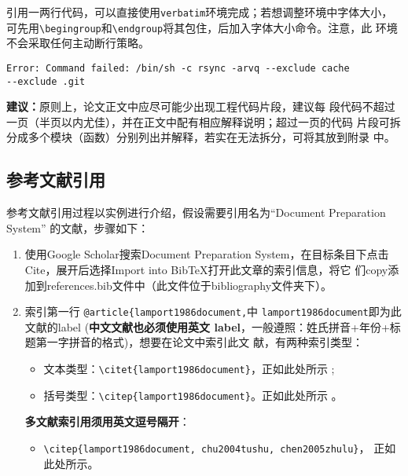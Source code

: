 引用一两行代码，可以直接使用\texttt{verbatim}环境完成；若想调整环境中字体大小，
可先用\verb|\begingroup|和\verb|\endgroup|将其包住，后加入字体大小命令。注意，此
环境不会采取任何主动断行策略。

\begingroup
    \small
    \begin{verbatim}
Error: Command failed: /bin/sh -c rsync -arvq --exclude cache
--exclude .git 
    \end{verbatim}
\endgroup

\begin{leftbar}
    \noindent\textbf{建议：}原则上，论文正文中应尽可能少出现工程代码片段，建议每
    段代码不超过一页（半页以内尤佳），并在正文中配有相应解释说明；超过一页的代码
    片段可拆分成多个模块（函数）分别列出并解释，若实在无法拆分，可将其放到附录
    中。
\end{leftbar}

\subsection{参考文献引用}\label{sub:references}

参考文献引用过程以实例进行介绍，假设需要引用名为``Document Preparation System''
的文献，步骤如下：
\begin{enumerate}
    \item 使用Google Scholar搜索Document Preparation System，在目标条目下点击
    Cite，展开后选择Import into BibTeX打开此文章的索引信息，将它
    们copy添加到references.bib文件中（此文件位于bibliography文件夹下）。
    \item 索引第一行 \verb|@article{lamport1986document,|中
    \verb|lamport1986document|即为此文献的label (\textbf{中文文献也必须使用英文
    label}，一般遵照：姓氏拼音+年份+标题第一字拼音的格式)，想要在论文中索引此文
    献，有两种索引类型：
    \begin{itemize}
        \item 文本类型：\verb|\citet{lamport1986document}|，正如此处所示
        \citet{lamport1986document}; 
        \item 括号类型：\verb|\citep{lamport1986document}|。正如此处所示
        \citep{lamport1986document}。
    \end{itemize}
    \textbf{多文献索引用须用英文逗号隔开}：
    \begin{itemize}
        \item \verb|\citep{lamport1986document, chu2004tushu, chen2005zhulu}|，
        正如此处所示\citep{lamport1986document, chu2004tushu, chen2005zhulu}。
    \end{itemize}
\end{enumerate}

